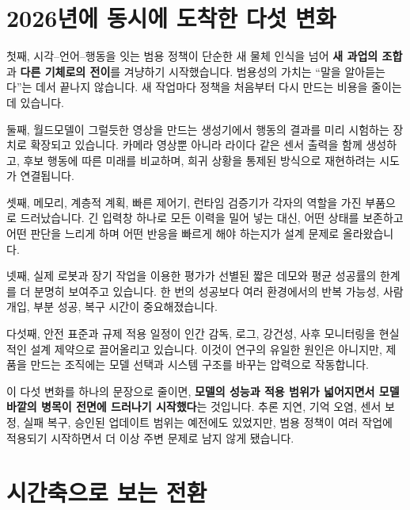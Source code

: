 \documentclass[11pt,openany]{book}
\newcommand{\keyterm}[1]{{\sffamily\bfseries\color{deepblue}#1}}
\begin{document}
\section{2026년에 동시에 도착한 다섯 변화}

첫째, 시각--언어--행동을 잇는 범용 정책이 단순한 새 물체 인식을 넘어 \keyterm{새 과업의 조합}과 \keyterm{다른 기체로의 전이}를 겨냥하기 시작했습니다. 범용성의 가치는 ``말을 알아듣는다''는 데서 끝나지 않습니다. 새 작업마다 정책을 처음부터 다시 만드는 비용을 줄이는 데 있습니다.

둘째, 월드모델이 그럴듯한 영상을 만드는 생성기에서 행동의 결과를 미리 시험하는 장치로 확장되고 있습니다. 카메라 영상뿐 아니라 라이다 같은 센서 출력을 함께 생성하고, 후보 행동에 따른 미래를 비교하며, 희귀 상황을 통제된 방식으로 재현하려는 시도가 연결됩니다.

셋째, 메모리, 계층적 계획, 빠른 제어기, 런타임 검증기가 각자의 역할을 가진 부품으로 드러났습니다. 긴 입력창 하나로 모든 이력을 밀어 넣는 대신, 어떤 상태를 보존하고 어떤 판단을 느리게 하며 어떤 반응을 빠르게 해야 하는지가 설계 문제로 올라왔습니다.

넷째, 실제 로봇과 장기 작업을 이용한 평가가 선별된 짧은 데모와 평균 성공률의 한계를 더 분명히 보여주고 있습니다. 한 번의 성공보다 여러 환경에서의 반복 가능성, 사람 개입, 부분 성공, 복구 시간이 중요해졌습니다.

다섯째, 안전 표준과 규제 적용 일정이 인간 감독, 로그, 강건성, 사후 모니터링을 현실적인 설계 제약으로 끌어올리고 있습니다. 이것이 연구의 유일한 원인은 아니지만, 제품을 만드는 조직에는 모델 선택과 시스템 구조를 바꾸는 압력으로 작동합니다.

\begin{profbox}
이 다섯 변화를 하나의 문장으로 줄이면, \textbf{모델의 성능과 적용 범위가 넓어지면서 모델 바깥의 병목이 전면에 드러나기 시작했다}는 것입니다. 추론 지연, 기억 오염, 센서 보정, 실패 복구, 승인된 업데이트 범위는 예전에도 있었지만, 범용 정책이 여러 작업에 적용되기 시작하면서 더 이상 주변 문제로 남지 않게 됐습니다.
\end{profbox}

\section{시간축으로 보는 전환}
\end{document}
